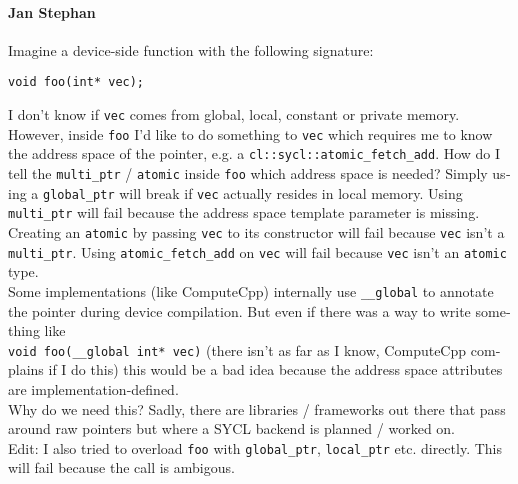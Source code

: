 \begin{otherlanguage}{english}
    \paragraph{Jan Stephan} Imagine a device-side function with the following
                            signature:
                            \begin{code}
                                \begin{verbatim}
void foo(int* vec);
                                \end{verbatim}
                            \end{code}
                            I don't know if \texttt{vec} comes from global,
                            local, constant or private memory. However, inside
                            \texttt{foo} I'd like to do something to
                            \texttt{vec} which requires me to know the address
                            space of the pointer, e.g. a
                            \texttt{cl::sycl::atomic\_fetch\_add}. How do I tell
                            the \texttt{multi\_ptr} / \texttt{atomic} inside
                            \texttt{foo} which address space is needed? Simply
                            using a \texttt{global\_ptr} will break if
                            \texttt{vec} actually resides in local memory. Using
                            \texttt{multi\_ptr} will fail because the address
                            space template parameter is missing. Creating an
                            \texttt{atomic} by passing \texttt{vec} to its
                            constructor will fail because \texttt{vec} isn't a
                            \texttt{multi\_ptr}. Using
                            \texttt{atomic\_fetch\_add} on \texttt{vec} will
                            fail because \texttt{vec} isn't an \texttt{atomic}
                            type.
                            \\
                            Some implementations (like ComputeCpp) internally
                            use \texttt{\_\_global} to annotate the pointer
                            during device compilation. But even if there was a
                            way to write something like\\
                            \texttt{void foo(\_\_global int* vec)}
                            (there isn't as far as I know, ComputeCpp complains
                            if I do this) this would be a bad idea because the
                            address space attributes are implementation-defined.
                            \\
                            Why do we need this? Sadly, there are libraries /
                            frameworks out there that pass around raw pointers
                            but where a SYCL backend is planned / worked on.
                            \\
                            Edit: I also tried to overload \texttt{foo} with
                            \texttt{global\_ptr}, \texttt{local\_ptr} etc.
                            directly. This will fail because the call is
                            ambigous.

\end{otherlanguage}
